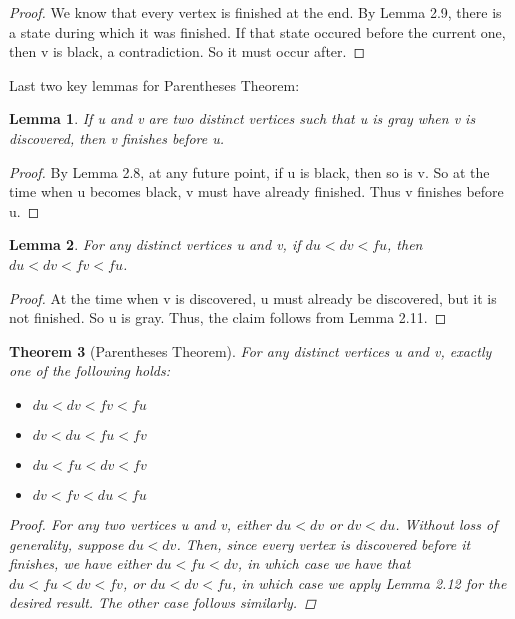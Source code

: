 \documentclass{article}
\newtheorem{theorem}{Theorem}[section]
\newtheorem{lemma}[theorem]{Lemma}
\begin{document}
\begin{proof}
We know that every vertex is finished at the end. By Lemma 2.9, there is a state during which it was finished. If that state occured before the current one, then v is black, a contradiction. So it must occur after.
\end{proof}
Last two key lemmas for Parentheses Theorem:
\begin{lemma}
If u and v are two distinct vertices such that u is gray when v is discovered, then v finishes before u.
\end{lemma}
\begin{proof}
By Lemma 2.8, at any future point, if u is black, then so is v. So at the time when u becomes black, v must have already finished. Thus v finishes before u.
\end{proof}
\begin{lemma}
For any distinct vertices u and v, if $ du < dv < fu$, then
\\ $du < dv < fv < fu$.
\end{lemma}
\begin{proof}
At the time when v is discovered, u must already be discovered, but it is not finished. So u is gray. Thus, the claim follows from Lemma 2.11.
\end{proof}
\begin{theorem}[Parentheses Theorem]
For any distinct vertices u and v, exactly one of the following holds:
\begin{itemize}
\item
$du < dv < fv < fu$
\item
$dv < du < fu < fv$
\item
$du < fu < dv < fv$
\item
$dv < fv < du < fu$
\end{itemize}
\begin{proof}
For any two vertices u and v, either $du < dv$ or $dv < du$. Without loss of generality, suppose $du < dv$. Then, since every vertex is discovered before it finishes, we have either $du < fu < dv$, in which case we have that $du < fu < dv < fv$, or $du < dv < fu$, in which case we apply Lemma 2.12 for the desired result. The other case follows similarly.
\end{proof}
\end{theorem}
\end{document}
